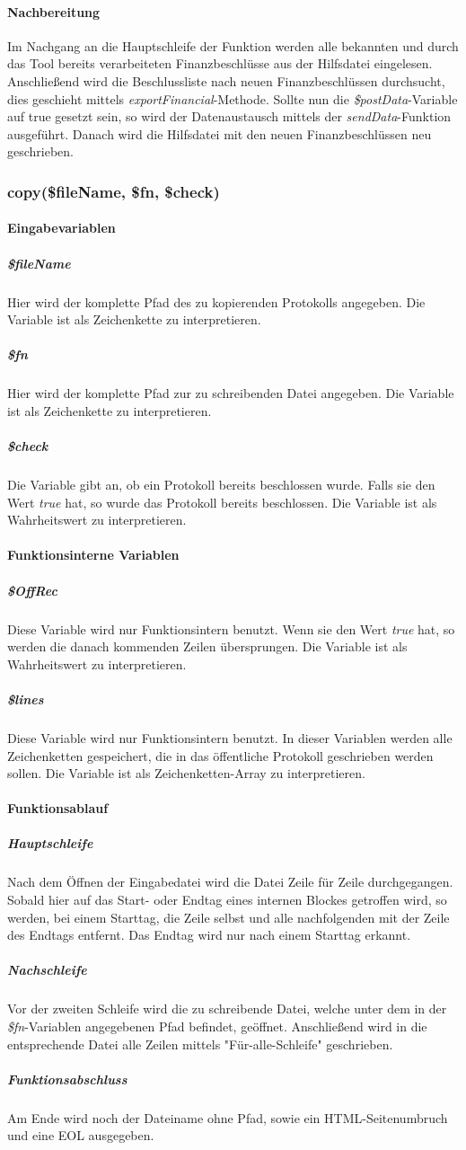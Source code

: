 \documentclass[12pt,parskip=full, pagea4]{scrreprt}
\begin{document}
	\paragraph{Nachbereitung} Im Nachgang an die Hauptschleife der Funktion werden alle bekannten und durch das Tool bereits verarbeiteten Finanzbeschlüsse aus der Hilfsdatei eingelesen. Anschließend wird die Beschlussliste nach neuen Finanzbeschlüssen durchsucht, dies geschieht mittels \textit{exportFinancial}-Methode. Sollte nun die \textit{\$postData}-Variable auf true gesetzt sein, so wird der Datenaustausch mittels der \textit{sendData}-Funktion ausgeführt. Danach wird die Hilfsdatei mit den neuen Finanzbeschlüssen neu geschrieben.
	
	\subsubsection{copy(\$fileName, \$fn, \$check)}
	\paragraph{Eingabevariablen}
	\subparagraph{\$fileName} Hier wird der komplette Pfad des zu kopierenden Protokolls angegeben. Die Variable ist als Zeichenkette zu interpretieren.
	\subparagraph{\$fn} Hier wird der komplette Pfad zur zu schreibenden Datei angegeben. Die Variable ist als Zeichenkette zu interpretieren.
	\subparagraph{\$check} Die Variable gibt an, ob ein Protokoll bereits beschlossen wurde. Falls sie den Wert \textit{true} hat, so wurde das Protokoll bereits beschlossen. Die Variable ist als Wahrheitswert zu interpretieren.
	\paragraph{Funktionsinterne Variablen}
	\subparagraph{\$OffRec} Diese Variable wird nur Funktionsintern benutzt. Wenn sie den Wert \textit{true} hat, so werden die danach kommenden Zeilen übersprungen. Die Variable ist als Wahrheitswert zu interpretieren.
	\subparagraph{\$lines} Diese Variable wird nur Funktionsintern benutzt. In dieser Variablen werden alle Zeichenketten gespeichert, die in das öffentliche Protokoll geschrieben werden sollen. Die Variable ist als Zeichenketten-Array zu interpretieren. 
	\paragraph{Funktionsablauf}
	\subparagraph{Hauptschleife} Nach dem Öffnen der Eingabedatei wird die Datei Zeile für Zeile durchgegangen. Sobald hier auf das Start- oder Endtag eines internen Blockes getroffen wird, so werden, bei einem Starttag, die Zeile selbst und alle nachfolgenden mit der Zeile des Endtags entfernt. Das Endtag wird nur nach einem Starttag erkannt.
	\subparagraph{Nachschleife} Vor der zweiten Schleife wird die zu schreibende Datei, welche unter dem in der \textit{\$fn}-Variablen angegebenen Pfad befindet, geöffnet. Anschließend wird in die entsprechende Datei alle Zeilen mittels "Für-alle-Schleife" geschrieben.
	\subparagraph{Funktionsabschluss} Am Ende wird noch der Dateiname ohne Pfad, sowie ein HTML-Seitenumbruch und eine EOL ausgegeben.
	
\end{document}
